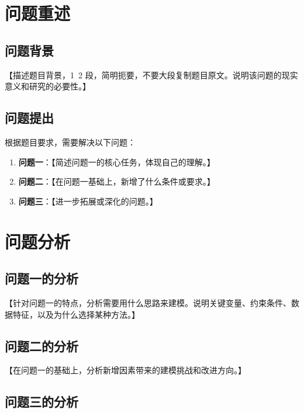 \documentclass[withoutpreface,bwprint]{cumcmthesis}
\begin{document}
\section{问题重述}

\subsection{问题背景}

【描述题目背景，1~2 段，简明扼要，不要大段复制题目原文。说明该问题的现实意义和研究的必要性。】

\subsection{问题提出}

根据题目要求，需要解决以下问题：

\begin{enumerate}
    \item \textbf{问题一}：【简述问题一的核心任务，体现自己的理解。】
    \item \textbf{问题二}：【在问题一基础上，新增了什么条件或要求。】
    \item \textbf{问题三}：【进一步拓展或深化的问题。】
\end{enumerate}

\section{问题分析}

\subsection{问题一的分析}

【针对问题一的特点，分析需要用什么思路来建模。说明关键变量、约束条件、数据特征，以及为什么选择某种方法。】

\subsection{问题二的分析}

【在问题一的基础上，分析新增因素带来的建模挑战和改进方向。】

\subsection{问题三的分析}
\end{document}
